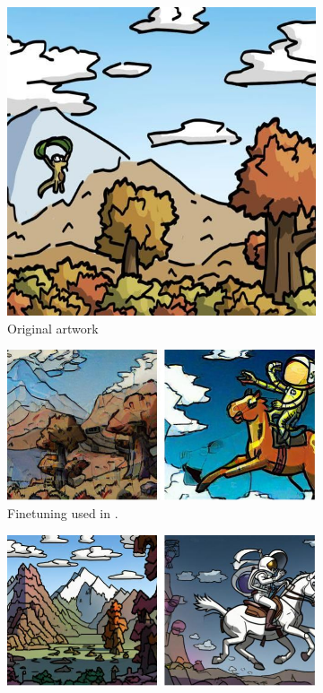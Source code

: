 \documentclass{article}
\begin{document}
\begin{figure}[]
\centering
\begin{subfigure}[b]{0.19\textwidth}
         \centering
         \includegraphics[width=\textwidth]{plots/process/original/0009.jpg}
         \caption{Original artwork}
     \end{subfigure}
     \hfill
     \begin{subfigure}[b]{0.39\textwidth}
         \centering
         \includegraphics[width=\textwidth]{plots/theirs.jpg}
         \caption{Finetuning used in \citep{glaze}.}
     \end{subfigure}
    \hfill
     \begin{subfigure}[b]{0.39\textwidth}
        \centering
         \includegraphics[width=\textwidth]{plots/ours.jpg}

\end{subfigure}
\end{figure}
\end{document}
